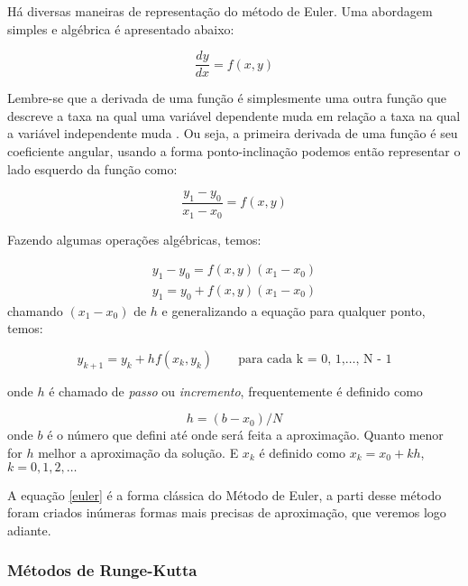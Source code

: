 Há diversas maneiras de representação do método de Euler. Uma abordagem simples
e algébrica é apresentado abaixo:

\begin{equation*}
\frac{dy}{dx} = f(x,y)
\end{equation*}

Lembre-se que a derivada de uma função é simplesmente uma outra
função que descreve a taxa na qual uma variável dependente muda em
relação a taxa na qual a variável independente muda \cite[tradução nossa]{thompson}.
Ou seja, a primeira derivada de uma função é seu coeficiente angular, usando a forma 
ponto-inclinação podemos então representar o lado esquerdo da função como:

\begin{equation*}
\frac{y_{1}-y_{0}}{x_{1}-x_{0}} = f(x,y)
\end{equation*}

Fazendo algumas operações algébricas, temos:

\begin{equation*}
\begin{split}
y_{1}-y_{0} = f(x,y)(x_{1}-x_{0})\\
y_{1} = y_{0} + f(x,y)(x_{1}-x_{0})
\end{split}
\end{equation*}
chamando $(x_{1}-x_{0})$ de $h$ e generalizando a equação para qualquer ponto, temos:

\begin{equation*}
y_{k+1} = y_{k} + hf(x_{k},y_{k})
\qquad \text{para cada k = 0, 1,$\dotsc$, N - 1}
\label{euler}
\end{equation*}

onde $h$ é chamado de \emph{passo} ou \emph{incremento}, frequentemente é definido como 

\begin{equation*}
h = (b-x_{0})/N
\end{equation*}
onde $b$ é o número que defini até onde será feita a aproximação. Quanto menor for $h$ melhor a 
aproximação da solução. E $x_{k}$ é definido como $x_{k} = x_{0}+kh$, $k = 0, 1, 2,\dotsc$

A equação \ref{euler} é a forma clássica do Método de Euler, a parti desse método foram criados inúmeras formas mais precisas de aproximação, que veremos logo adiante.

\subsubsection{Métodos de Runge-Kutta}

